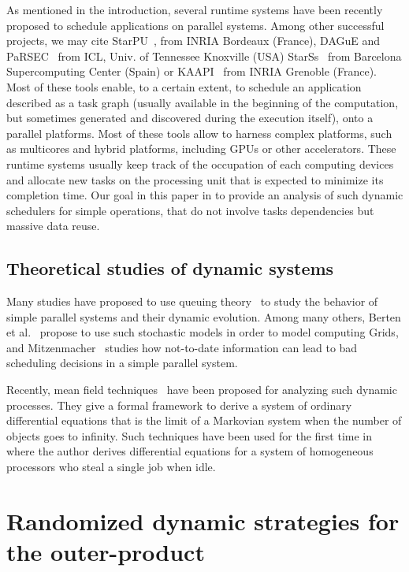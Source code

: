 \documentclass[a4paper,10pt]{article}
\begin{document}
As mentioned in the introduction, several runtime systems have been
recently proposed to schedule applications on parallel systems. Among
other successful projects, we may cite StarPU~\cite{starpu}, from INRIA
Bordeaux (France), DAGuE and PaRSEC~\cite{dague,parsec} from ICL,
Univ. of Tennessee Knoxville (USA) StarSs~\cite{starss} from Barcelona
Supercomputing Center (Spain) or KAAPI~\cite{kaapi} from INRIA Grenoble
(France). Most of these tools enable, to a certain extent, to schedule
an application described as a task graph (usually available in the
beginning of the computation, but sometimes generated and discovered
during the execution itself), onto a parallel platforms. Most of these tools
allow to harness complex platforms, such as multicores and hybrid
platforms, including GPUs or other accelerators. These runtime systems
usually keep track of the occupation of each computing devices and
allocate new tasks on the processing unit that is expected to minimize
its completion time. Our goal in this paper in to provide an analysis
of such dynamic schedulers for simple operations, that do not involve tasks dependencies but massive data reuse.


\subsection{Theoretical studies of dynamic systems}

Many studies have proposed to use queuing
theory~\cite{queueing-theory-book} to study the behavior of simple
parallel systems and their dynamic evolution. Among many others, Berten
et al.~\cite{BertenG07} propose to use such stochastic models in order to model
computing Grids, and Mitzenmacher~\cite{Mitzenmacher00oldinfo} studies
how not-to-date information can lead to bad scheduling decisions in a
simple parallel system.

Recently, mean field techniques~\cite{gast2012mean,benaim2008class}
have been proposed for analyzing such dynamic processes. They give a
formal framework to derive a system of ordinary differential equations
that is the limit of a Markovian system when the number of objects
goes to infinity. Such techniques have been used for the first time
in~\cite{Mitzenmacher1998loadstealing} where the author derives
differential equations for a system of homogeneous processors who
steal a single job when idle.




\section{Randomized dynamic strategies for the outer-product}
\label{outer}
\end{document}

